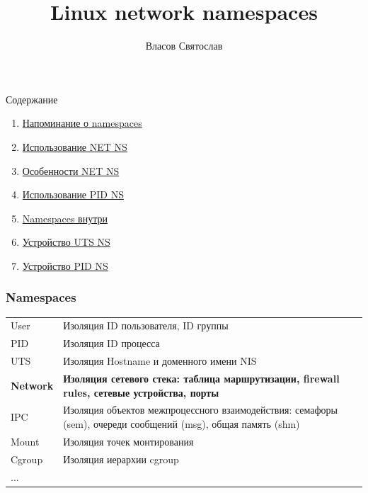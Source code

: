 
\makeatletter
{}
\makeatother
\graphicspath{{./fig/}}

\title{Linux network namespaces}
\author[Власов Святослав]{
    Власов Святослав
}


\maketitle

\begin{frame}{Содержание}
\begin{large}
\begin{enumerate}
	\item \hyperlink{namespaces_overview}{Напоминание о namespaces}
	\item \hyperlink{net_ns_usage}{Использование NET NS}
    \item \hyperlink{net_ns_features}{Особенности NET NS}
	\item \hyperlink{pid_ns_usage}{Использование PID NS}
	\item \hyperlink{ns_internals}{Namespaces внутри}
	\item \hyperlink{uts_ns_inter}{Устройство UTS NS}
	\item \hyperlink{pid_ns_inter}{Устройство PID NS}
\end{enumerate}
\end{large}
\end{frame}

\begin{frame}[label={namespaces_overview}]
\frametitle{Namespaces}
\begin{tabular}{lp{9cm}}
	\alert{User} & Изоляция ID пользователя, ID группы \\
	\alert{PID} & Изоляция ID процесса \\
	\alert{UTS} & Изоляция Hostname и доменного имени NIS \\
    \alert{\textbf{Network}} & \textbf{Изоляция сетевого стека: таблица маршрутизации, firewall rules, сетевые устройства, порты} \\
	\alert{IPC} & Изоляция объектов межпроцессного взаимодействия: семафоры (sem), очереди сообщений (msg), общая память (shm) \\
	\alert{Mount} & Изоляция точек монтирования \\
	\alert{Cgroup} & Изоляция иерархии cgroup \\
	... & 
\end{tabular}
\end{frame}

